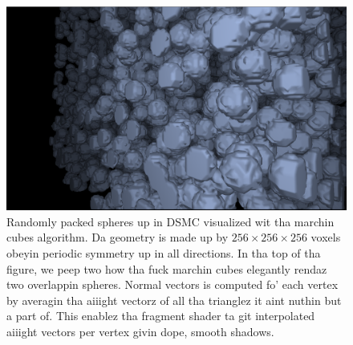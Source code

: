 \begin{figure}[htb]
\begin{center}
\includegraphics[width=\textwidth, trim=0cm 0cm 0cm 0cm, clip]{visualization/figures/marching_cubes_spheres_1.png}
\end{center}
\caption{Randomly packed spheres up in DSMC visualized wit tha marchin cubes algorithm. Da geometry is made up by $256\times256\times256$ voxels obeyin periodic symmetry up in all directions. In tha top of tha figure, we peep two how tha fuck marchin cubes elegantly rendaz two overlappin spheres. Normal vectors is computed fo' each vertex by averagin tha aiiight vectorz of all tha trianglez it aint nuthin but a part of. This enablez tha fragment shader ta git interpolated aiiight vectors per vertex givin dope, smooth shadows.}
\label{fig:vis_marching_cubes_1}
\end{figure}